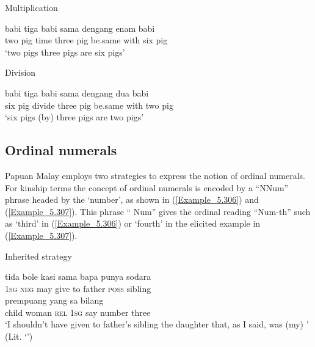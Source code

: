 \begin{styleExampleTitle}
Multiplication
\end{styleExampleTitle}

\ea
\label{Example_5.304}
 {babi} {} {tiga} {babi} {sama} {dengang} {enam} {babi}\\ %
 two  pig  time  three  pig  be.same  with  six  pig\\
\glt 
‘two pigs  three pigs are six pigs’ \textstyleExampleSource{[Elicited BR120820.003]}
\z

\begin{styleExampleTitle}
Division
\end{styleExampleTitle}

\ea
\label{Example_5.305}
 {babi} {} {tiga} {babi} {sama} {dengang} {dua} {babi}\\ %
 six  pig  divide  three  pig  be.same  with  two  pig\\
\glt
‘six pigs  (by) three pigs are two pigs’ \textstyleExampleSource{[Elicited BR120820.004]}
\z


\subsection{Ordinal numerals}
\label{Para_5.9.2}
Papuan Malay employs two strategies to express the notion of ordinal numerals. For kinship terms the concept of ordinal numerals is encoded by a ``NNum''  phrase headed by the   ‘number’, as shown in (\ref{Example_5.306}) and (\ref{Example_5.307}). This  phrase `` Num'' gives the ordinal reading ``Num-th'' such as  ‘third’ in (\ref{Example_5.306}) or  ‘fourth’ in the elicited example in (\ref{Example_5.307}).


\begin{styleExampleTitle}
Inherited strategy
\end{styleExampleTitle}

\ea
\label{Example_5.306}
 {{tida}} {bole} {{kasi}} {{sama}} {{bapa}} {{punya}} {{sodara}}\\ %
 \textsc{1sg}  {\textsc{neg}}  may  {give}  {to}  {father}  {\textsc{poss}}  {sibling}\\
  {prempuang}  {yang}  {sa}  {bilang}  {}  \\
 {child}  {woman}  {\textsc{rel}}  {\textsc{1sg}}  {say}  {number}  three\\
 ‘I shouldn’t have given to father’s sibling the daughter that, as I said, was (my) ’ (Lit. ‘’) \textstyleExampleSource{[081006-024-CvEx.0088]}
\z

